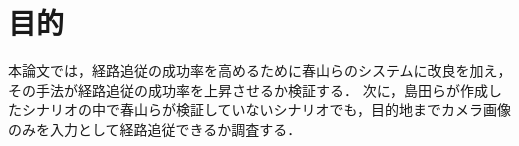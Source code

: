 \section{目的}
本論文では，経路追従の成功率を高めるために春山らのシステムに改良を加え，その手法が経路追従の成功率を上昇させるか検証する．
次に，島田らが作成したシナリオの中で春山らが検証していないシナリオでも，目的地までカメラ画像のみを入力として経路追従できるか調査する．